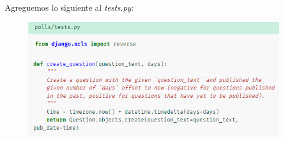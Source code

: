 \documentclass[10pt]{article}
\begin{document}
Agreguemos lo siguiente al \textit{tests.py}:
\begin{figure}[H]
\begin{center}
\includegraphics[scale=0.8]{figuras/3/35/357/img6.png}
\end{center}
\end{figure}
\end{document}
